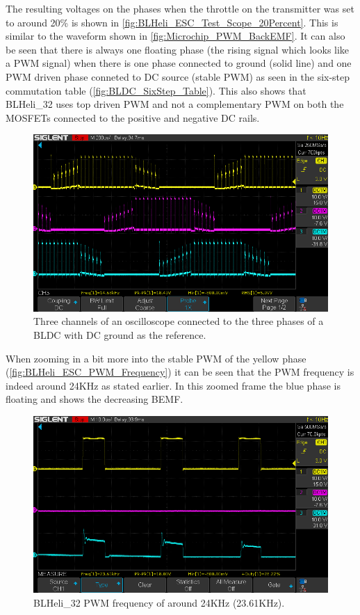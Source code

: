 \documentclass[]{report}
\begin{document}
The resulting voltages on the phases when the throttle on the transmitter was set to around 20\% is shown in \autoref{fig:BLHeli_ESC_Test_Scope_20Percent}. This is similar to the waveform shown in \autoref{fig:Microchip_PWM_BackEMF}. It can also be seen that there is always one floating phase (the rising signal which looks like a PWM signal) when there is one phase connected to ground (solid line) and one PWM driven phase conneted to DC source (stable PWM) as seen in the six-step commutation table (\autoref{fig:BLDC_SixStep_Table}). This also shows that BLHeli\_32 uses top driven PWM and not a complementary PWM on both the MOSFETs connected to the positive and negative DC rails.

\begin{figure}[H]
	\centering
	\includegraphics[width=\textwidth]{Scope/EmaxEco2306_threePhases/20PercentThrottle/20PercentThrottleZoomed.png}
	\caption{Three channels of an oscilloscope connected to the three phases of a BLDC with DC ground as the reference.}
	\label{fig:BLHeli_ESC_Test_Scope_20Percent}
\end{figure}

When zooming in a bit more into the stable PWM of the yellow phase (\autoref{fig:BLHeli_ESC_PWM_Frequency}) it can be seen that the PWM frequency is indeed around 24KHz as stated earlier. In this zoomed frame the blue phase is floating and shows the decreasing BEMF.

\begin{figure}[h]
	\centering
	\includegraphics[width=\textwidth]{Scope/EmaxEco2306_threePhases/20PercentThrottle/PWMFreq.png}
	\caption{BLHeli\_32 PWM frequency of around 24KHz (23.61KHz).}
	\label{fig:BLHeli_ESC_PWM_Frequency}
\end{figure} 
\end{document}
